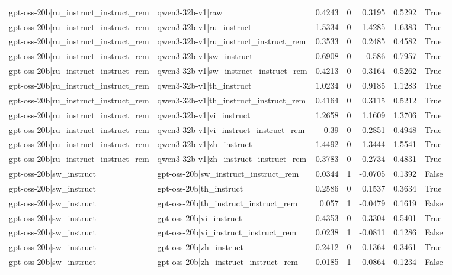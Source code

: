 \begin{table}
\begin{tabular}{l l r r r r l}
gpt-oss-20b|ru_instruct_instruct_rem & qwen3-32b-v1|raw & 0.4243 & 0 & 0.3195 & 0.5292 & True \\
gpt-oss-20b|ru_instruct_instruct_rem & qwen3-32b-v1|ru_instruct & 1.5334 & 0 & 1.4285 & 1.6383 & True \\
gpt-oss-20b|ru_instruct_instruct_rem & qwen3-32b-v1|ru_instruct_instruct_rem & 0.3533 & 0 & 0.2485 & 0.4582 & True \\
gpt-oss-20b|ru_instruct_instruct_rem & qwen3-32b-v1|sw_instruct & 0.6908 & 0 & 0.586 & 0.7957 & True \\
gpt-oss-20b|ru_instruct_instruct_rem & qwen3-32b-v1|sw_instruct_instruct_rem & 0.4213 & 0 & 0.3164 & 0.5262 & True \\
gpt-oss-20b|ru_instruct_instruct_rem & qwen3-32b-v1|th_instruct & 1.0234 & 0 & 0.9185 & 1.1283 & True \\
gpt-oss-20b|ru_instruct_instruct_rem & qwen3-32b-v1|th_instruct_instruct_rem & 0.4164 & 0 & 0.3115 & 0.5212 & True \\
gpt-oss-20b|ru_instruct_instruct_rem & qwen3-32b-v1|vi_instruct & 1.2658 & 0 & 1.1609 & 1.3706 & True \\
gpt-oss-20b|ru_instruct_instruct_rem & qwen3-32b-v1|vi_instruct_instruct_rem & 0.39 & 0 & 0.2851 & 0.4948 & True \\
gpt-oss-20b|ru_instruct_instruct_rem & qwen3-32b-v1|zh_instruct & 1.4492 & 0 & 1.3444 & 1.5541 & True \\
gpt-oss-20b|ru_instruct_instruct_rem & qwen3-32b-v1|zh_instruct_instruct_rem & 0.3783 & 0 & 0.2734 & 0.4831 & True \\
gpt-oss-20b|sw_instruct & gpt-oss-20b|sw_instruct_instruct_rem & 0.0344 & 1 & -0.0705 & 0.1392 & False \\
gpt-oss-20b|sw_instruct & gpt-oss-20b|th_instruct & 0.2586 & 0 & 0.1537 & 0.3634 & True \\
gpt-oss-20b|sw_instruct & gpt-oss-20b|th_instruct_instruct_rem & 0.057 & 1 & -0.0479 & 0.1619 & False \\
gpt-oss-20b|sw_instruct & gpt-oss-20b|vi_instruct & 0.4353 & 0 & 0.3304 & 0.5401 & True \\
gpt-oss-20b|sw_instruct & gpt-oss-20b|vi_instruct_instruct_rem & 0.0238 & 1 & -0.0811 & 0.1286 & False \\
gpt-oss-20b|sw_instruct & gpt-oss-20b|zh_instruct & 0.2412 & 0 & 0.1364 & 0.3461 & True \\
gpt-oss-20b|sw_instruct & gpt-oss-20b|zh_instruct_instruct_rem & 0.0185 & 1 & -0.0864 & 0.1234 & False \\

\end{tabular}
\end{table}
